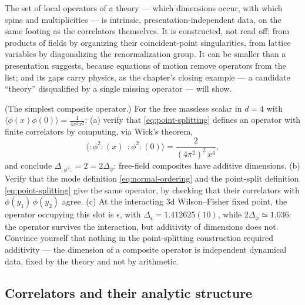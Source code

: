 \begin{iidea}
\label{idea:operator-content}
The set of local operators of a theory --- which dimensions occur, with which
spins and multiplicities --- is intrinsic, presentation-independent data, on
the same footing as the correlators themselves. It is constructed, not read
off: from products of fields by organizing their coincident-point
singularities, from lattice variables by diagonalizing the renormalization
group. It can be smaller than a presentation suggests, because equations of
motion remove operators from the list; and its gaps carry physics, as the
chapter's closing example --- a candidate ``theory'' disqualified by a single
missing operator --- will show.
\end{iidea}

\begin{exercise}[classic]
\label{exr:point-splitting}
(The simplest composite operator.) For the free massless scalar in $d=4$ with
$\langle\phi(x)\phi(0)\rangle = \frac{1}{4\pi^2 x^2}$: (a) verify that
\eqref{eq:point-splitting} defines an operator with finite correlators by
computing, via Wick's theorem,
\begin{equation*}
\big\langle :\!\phi^2\!:(x)\;\, :\!\phi^2\!:(0) \big\rangle
= \frac{2}{(4\pi^2)^2\, x^4},
\end{equation*}
and conclude $\Delta_{:\phi^2:} = 2 = 2\Delta_\phi$: free-field composites
have additive dimensions. (b) Verify that the mode definition
\eqref{eq:normal-ordering} and the point-split definition
\eqref{eq:point-splitting} give the same operator, by checking that their
correlators with $\phi(y_1)\,\phi(y_2)$ agree. (c) At the interacting 3d
Wilson--Fisher fixed point, the operator occupying this slot is $\epsilon$,
with $\Delta_\epsilon = 1.412625(10)$, while $2\Delta_\phi \simeq 1.036$:
the operator survives the interaction, but additivity of dimensions does
not. Convince yourself that nothing in the point-splitting construction
required additivity --- the dimension of a composite operator is independent
dynamical data, fixed by the theory and not by arithmetic.
\end{exercise}

\subsection{Correlators and their analytic structure}
\label{sec:analytic-structure}

